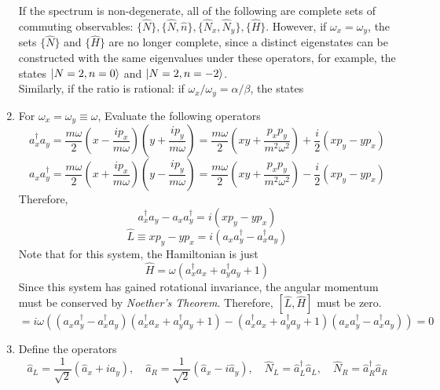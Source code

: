 \begin{sol}
\begin{enumerate}[label=\textbf{(\alph*)}]
\begin{center}
\end{center}
If the spectrum is non-degenerate, all of the following are complete sets of commuting observables: $\{\hat N\},\{\hat N,\hat n\},\{\hat N_x,\hat N_y\}, \{\hat H\}$. However, if $\omega_x=\omega _y$, the sets $\{\hat N\}$ and $\{\hat H\}$ are no longer complete, since a distinct eigenstates can be constructed with the same eigenvalues under these operators, for example, the states $\ket{N=2,n=0}$ and $\ket{N=2,n=-2}$.\\
Similarly, if the ratio is rational: if $\omega_x/\omega_y=\alpha/\beta$, the states 
\item 
For $\omega_x=\omega_y\equiv \omega$, Evaluate the following operators
\begin{equation}
	a_x^\dagger a_y=\frac{m\omega}{2}\left(x-\frac{ip_x}{m\omega}\right)\left(y+\frac{ip_y}{m\omega}\right)=\frac{m\omega}{2}\left(xy+\frac{p_xp_y}{m^2\omega^2}\right)+\frac{i}{2}(xp_y-yp_x)
\end{equation}
\begin{equation}
	a_xa_y^\dagger=\frac{m\omega}{2}\left(x+\frac{ip_x}{m\omega}\right)\left(y-\frac{ip_y}{m\omega}\right)=\frac{m\omega}{2}\left(xy+\frac{p_xp_y}{m^2\omega^2}\right)-\frac{i}{2}(xp_y-yp_x)
\end{equation}
Therefore,
\begin{equation}
	a_x^\dagger a_y-a_xa_y^\dagger=i(xp_y-yp_x)
\end{equation}
\begin{equation}
	\hat L\equiv xp_y-yp_x=i(a_x a_y^\dagger-a_x^\dagger a_y) 
\end{equation} 
Note that for this system, the Hamiltonian is just 
\begin{equation}
	\hat H=\omega(a_x^\dagger a_x+a_y^\dagger a_y+1)
\end{equation} 
Since this system has gained rotational invariance, the angular momentum must be conserved by \textit{Noether's Theorem}. Therefore, $[\hat L,\hat H]$ must be zero.
\begin{equation}
	[\hat L,\hat H]=i\omega\left((a_x a_y^\dagger-a_x^\dagger a_y)(a_x^\dagger a_x+a_y^\dagger a_y+1)-(a_x^\dagger a_x+a_y^\dagger a_y+1)(a_x a_y^\dagger-a_x^\dagger a_y)\right)=0
\end{equation}
\item
Define the operators
\begin{equation}
	\hat a_L=\frac{1}{\sqrt{2}}(\hat a_x+ia_y),\,\,\,\,\,\,\hat a_R=\frac{1}{\sqrt{2}}(\hat a_x-i\hat a_y),\,\,\,\,\,\,\hat N_L=\hat a_L^\dagger\hat a_L,\,\,\,\,\,\,\hat N_R=\hat a_R^\dagger\hat a_R

\end{equation}
\end{enumerate}
\end{sol}
